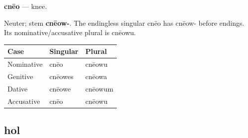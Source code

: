 \par\begin{minipage}{\linewidth}\raggedright
\textbf{cnēo} — knee.

Neuter; stem \textbf{cnēow-}. The endingless singular cnēo has cnēow- before endings. Its nominative/\allowbreak{}accusative plural is cnēowu.

\par\begingroup
\fontsize{10.5}{13.2}\selectfont
\setlength{\LTleft}{0pt}\setlength{\LTright}{\fill}
\noindent
\begin{tabular}{@{}>{\raggedright\arraybackslash}p{39.46mm}>{\raggedright\arraybackslash}p{39.46mm}>{\raggedright\arraybackslash}p{39.46mm}@{}}
\toprule
\textbf{Case} & \textbf{Singular} & \textbf{Plural} \\
\midrule
Nominative & cnēo & cnēowu \\
Genitive & cnēowes & cnēowa \\
Dative & cnēowe & cnēowum \\
Accusative & cnēo & cnēowu \\
\bottomrule
\end{tabular}
\par\endgroup

\end{minipage}\par
{}
\subsection*{hol}

